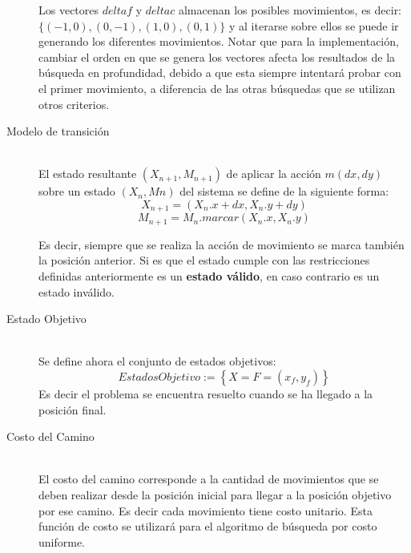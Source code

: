 \documentclass[letter, titlepage, 10pt]{article}
\begin{document}
\begin{description}
\begin{lstlisting}
  \end{lstlisting}
  
Los vectores $deltaf$ y $deltac$ almacenan los posibles movimientos, es decir: $\{(-1, 0), (0, -1), (1, 0), (0, 1)\}$ y al iterarse sobre ellos se puede ir generando los diferentes movimientos. Notar que para la implementación, cambiar el orden en que se genera los vectores afecta los resultados de la búsqueda en profundidad, debido a que esta siempre intentará probar con el primer movimiento, a diferencia de las otras búsquedas que se utilizan otros criterios.
  
    \item[Modelo de transición] \hfill \\
    El estado resultante $(X_{n+1},M_{n+1})$ de aplicar la acción $m(dx,dy)$ sobre un estado $(X_{n},M{n})$ del sistema se define de la siguiente forma:
    \begin{displaymath}
      X_{n+1} = (X_{n}.x + dx, X_{n}.y + dy)
    \end{displaymath}
    \begin{displaymath}
      M_{n+1} = M_{n}.marcar(X_{n}.x, X_{n}.y) 
    \end{displaymath}

    Es decir, siempre que se realiza la acción de movimiento se marca también la posición anterior. Si es que el estado cumple con las restricciones definidas anteriormente es un \textbf{estado válido}, en caso contrario es un estado inválido.
   
    \item[Estado Objetivo] \hfill \\
Se define ahora el conjunto de estados objetivos:
    \begin{displaymath}
      EstadosObjetivo := \left\lbrace X = F = (x_f, y_f) \right\rbrace
    \end{displaymath}
Es decir el problema se encuentra resuelto cuando se ha llegado a la posición final.

    \item[Costo del Camino] \hfill \\
    El costo del camino corresponde a la cantidad de movimientos que se deben realizar desde la posición inicial para llegar a la posición objetivo por ese camino. Es decir cada movimiento tiene costo unitario. Esta función de costo se utilizará para el algoritmo de búsqueda por costo uniforme.
    

\end{description}
\end{document}
